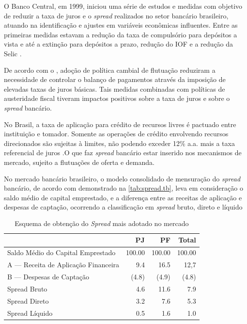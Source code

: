 \documentclass[
  12pt,
  12pt,
  openright,
  oneside,
  a4paper,
  chapter=TITLE,
  section=TITLE,
  subsection=TITLE,
  subsubsection=TITLE,
  english,
  portugues,
  sumario=tradicional]{abntex2}
\begin{document}
O Banco Central, em 1999, iniciou uma série de estudos e medidas com objetivo de reduzir a taxa de juros e o \emph{spread} realizados no setor bancário brasileiro, atuando na identificação e ajustes em variáveis econômicas influentes. Entre as primeiras medidas estavam a redução da taxa de compulsório para depósitos a vista e até a extinção para depósitos a prazo, redução do IOF e a redução da Selic \cite{BCB:2000}.

De acordo com o \textcite{BCB:1999}, adoção de política cambial de flutuação reduziram a necessidade de controlar o balanço de pagamentos através da imposição de elevadas taxas de juros básicas. Tais medidas combinadas com políticas de austeridade fiscal tiveram impactos positivos sobre a taxa de juros e sobre o \emph{spread} bancário.

No Brasil, a taxa de aplicação para crédito de recursos livres é pactuado entre instituição e tomador. Somente as operações de crédito envolvendo recursos direcionados são sujeitas à limites, não podendo exceder 12\% a.a. mais a taxa referencial de juros \cite{BCB:2016}.O que faz \emph{spread} bancário estar inserido nos mecanismos de mercado, sujeito a flutuações de oferta e demanda.

No mercado bancário brasileiro, o modelo consolidado de mensuração do \emph{spread} bancário, de acordo com demonstrado na \autoref{tab:spread.tb}, leva em consideração o saldo médio de capital emprestado, e a diferença entre as receitas de aplicação e despesas de captação, ocorrendo a classificação em \emph{spread} bruto, direto e líquido \cite{fipecafi:2005}

\begin{table}[!htbp]
\vspace{20pt}
 \centering
   \caption{Esquema de obtenção do \emph{Spread} mais adotado no mercado} 
   \vspace{1mm}
    \label{tab:spread.tb}
     \begin{tabular}{l|r|r|r}
      \hline
                                           &   PJ   &   PF    & Total \\
       \hline
       Saldo Médio do Capital Emprestado   & 100.00 & 100.00  & 100.00 \\
       A — Receita de Aplicação Financeira & 9.4    & 16.5    & 12,7   \\
       B — Despesas de Captação            & (4.8)  & (4.9)   & (4.8)  \\   
       Spread Bruto                        & 4.6    & 11.6    & 7.9    \\
       Spread Direto                       & 3.2    & 7.6     & 5.3    \\
       Spread Líquido                      & 0.5    & 1.6     & 1.0    \\
       \hline
       \end{tabular}
\vspace{1mm}
\vspace{-2mm}
\end{table}
\end{document}

